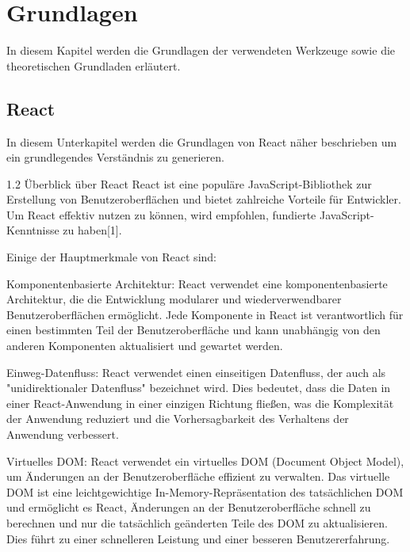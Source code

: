 


\chapter{Grundlagen}
In diesem Kapitel werden die Grundlagen der verwendeten Werkzeuge sowie die theoretischen Grundladen erläutert.
\section{React}
In diesem Unterkapitel werden die Grundlagen von React näher beschrieben um ein grundlegendes Verständnis zu generieren.

1.2 Überblick über React
React ist eine populäre JavaScript-Bibliothek zur Erstellung von Benutzeroberflächen und bietet zahlreiche Vorteile für Entwickler. Um React effektiv nutzen zu können, wird empfohlen, fundierte JavaScript-Kenntnisse zu haben[1].

Einige der Hauptmerkmale von React sind:

Komponentenbasierte Architektur: React verwendet eine komponentenbasierte Architektur, die die Entwicklung modularer und wiederverwendbarer Benutzeroberflächen ermöglicht. Jede Komponente in React ist verantwortlich für einen bestimmten Teil der Benutzeroberfläche und kann unabhängig von den anderen Komponenten aktualisiert und gewartet werden.

Einweg-Datenfluss: React verwendet einen einseitigen Datenfluss, der auch als "unidirektionaler Datenfluss" bezeichnet wird. Dies bedeutet, dass die Daten in einer React-Anwendung in einer einzigen Richtung fließen, was die Komplexität der Anwendung reduziert und die Vorhersagbarkeit des Verhaltens der Anwendung verbessert.

Virtuelles DOM: React verwendet ein virtuelles DOM (Document Object Model), um Änderungen an der Benutzeroberfläche effizient zu verwalten. Das virtuelle DOM ist eine leichtgewichtige In-Memory-Repräsentation des tatsächlichen DOM und ermöglicht es React, Änderungen an der Benutzeroberfläche schnell zu berechnen und nur die tatsächlich geänderten Teile des DOM zu aktualisieren. Dies führt zu einer schnelleren Leistung und einer besseren Benutzererfahrung.

